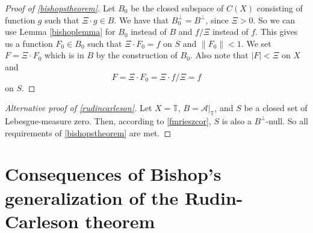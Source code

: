 \documentclass[a4paper,12pt,twoside,BCOR=10mm]{scrbook}
\theoremstyle{definition}
\theoremstyle{definition}
\theoremstyle{definition}
\begin{document}
\begin{proof}[Proof of \ref{bishopstheorem}]
Let $B_0$ be the closed subspace of $C(X)$ consisting of function $g$ such that $\Xi \cdot g \in B$.
We have that $B_0^{\bot} = B^{\bot}$, since $\Xi > 0$.
So we can use Lemma \ref{bishoplemma} for $B_0$ instead of $B$ and $f/\Xi$ instead of $f$.
This gives us a function $F_0 \in B_0$ such that $\Xi \cdot F_0 = f$ on $S$ and $\|F_0\| < 1$.
We set $F = \Xi \cdot F_0$ which is in $B$ by the construction of $B_0$.
Also note that $|F| < \Xi$ on $X$ and 
\[
	F = \Xi \cdot F_0 = \Xi \cdot f/\Xi = f
\]
on $S$.
\end{proof}
\begin{proof}[Alternative proof of \ref{rudincarleson}]
Let
	$X = \mathbb{T}$,
	$B = \mathcal{A}|_{\mathbb{T}}$,
	and $S$ be a closed set of Lebesgue-measure zero. 
Then, according to \ref{fmrieszcor}, $S$ is also a $B^{\bot}$-null.
So all requirements of \ref{bishopstheorem} are met.
\end{proof}

\chapter{Consequences of Bishop's generalization of the Rudin-Carleson theorem}
\end{document}
